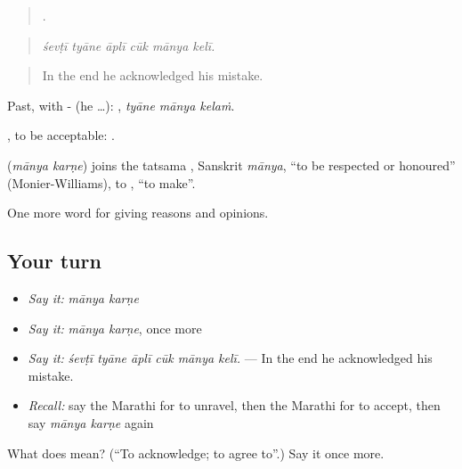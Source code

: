 \begin{quote}
     .
\end{quote}

\begin{quote}
\emph{śevṭī tyāne āplī cūk mānya kelī.}
\end{quote}

\begin{quote}
In the end he acknowledged his mistake.
\end{quote}

Past, with - (he …):   , \emph{tyāne mānya kelaṁ}.

 , to be acceptable:    .

\begin{cousinweb}
\textbf{ } (\emph{mānya karṇe}) joins the tatsama , Sanskrit \emph{mānya}, \textquotedblleft{}to be respected or honoured\textquotedblright{} (Monier-Williams), to , \textquotedblleft{}to make\textquotedblright{}.
\end{cousinweb}

\begin{grammarlens}[title={What you've built}]
One more word for giving reasons and opinions.
\end{grammarlens}

\subsection*{Your turn}
\begin{itemize}
\raggedright
  \item \emph{Say it:} \emph{mānya karṇe}
  \item \emph{Say it:} \emph{mānya karṇe}, once more
  \item \emph{Say it:} \emph{śevṭī tyāne āplī cūk mānya kelī.} — In the end he acknowledged his mistake.
  \item \emph{Recall:} say the Marathi for to unravel, then the Marathi for to accept, then say \emph{mānya karṇe} again
\end{itemize}

\begin{tcolorbox}[breakable,colback=teal!4,colframe=teal!35!black,title={Before you move on}]
What does   mean? (\textquotedblleft{}To acknowledge; to agree to\textquotedblright{}.) Say it once more.
\end{tcolorbox}
